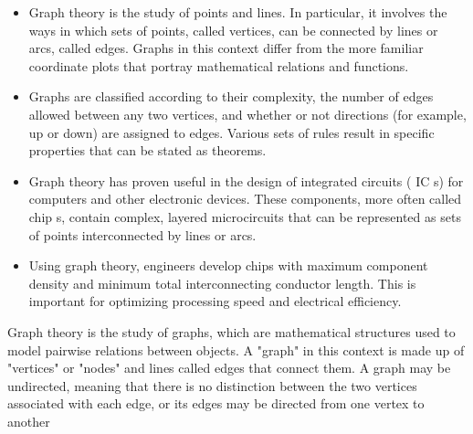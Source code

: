 \documentclass[a4paper,12pt]{article}
\begin{document}
\begin{itemize}
\item Graph theory is the study of points and lines. In particular, it involves the ways in which sets of points, called vertices, can be connected by lines or arcs, called edges. Graphs in this context differ from the more familiar coordinate plots that portray mathematical relations and functions.

\item Graphs are classified according to their complexity, the number of edges allowed between any two vertices, and whether or not directions (for example, up or down) are assigned to edges. Various sets of rules result in specific properties that can be stated as theorems.

\item Graph theory has proven useful in the design of integrated circuits ( IC s) for computers and other electronic devices. These components, more often called chip s, contain complex, layered microcircuits that can be represented as sets of points interconnected by lines or arcs. 

\item Using graph theory, engineers develop chips with maximum component density and minimum total interconnecting conductor length. This is important for optimizing processing speed and electrical efficiency.
\end{itemize}


Graph theory is the study of graphs, which are mathematical structures used to model pairwise relations between objects. A "graph" in this context is made up of "vertices" or "nodes" and lines called edges that connect them. A graph may be undirected, meaning that there is no distinction between the two vertices associated with each edge, or its edges may be directed from one vertex to another
\end{document}
